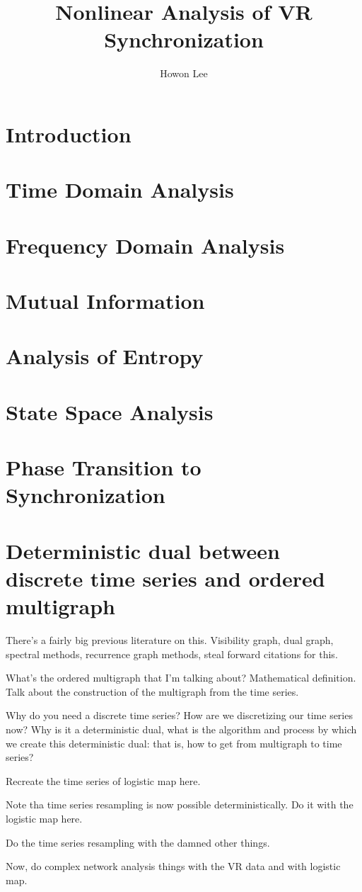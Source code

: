 \documentclass[12pt]{article}
\begin{document}
\title{Nonlinear Analysis of VR Synchronization}
\author{Howon Lee}
\maketitle

\section{Introduction}
\section{Time Domain Analysis}
\section{Frequency Domain Analysis}
\section{Mutual Information}
\section{Analysis of Entropy}
\section{State Space Analysis}
\section{Phase Transition to Synchronization}

\section{Deterministic dual between discrete time series and ordered multigraph}

There's a fairly big previous literature on this. Visibility graph, dual graph, spectral methods, recurrence graph methods, steal forward citations for this.

What's the ordered multigraph that I'm talking about? Mathematical definition. Talk about the construction of the multigraph from the time series.

Why do you need a discrete time series? How are we discretizing our time series now? Why is it a deterministic dual, what is the algorithm and process by which we create this deterministic dual: that is, how to get from multigraph to time series?

Recreate the time series of logistic map here.

Note tha time series resampling is now possible deterministically. Do it with the logistic map here.

Do the time series resampling with the damned other things.

Now, do complex network analysis things with the VR data and with logistic map.
\end{document}
